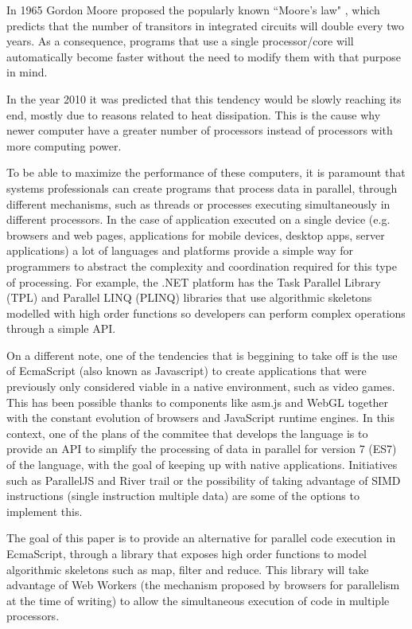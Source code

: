 \documentclass[runningheads,a4paper]{llncs}
\begin{document}
In 1965 Gordon Moore proposed the popularly known ``Moore's law" \cite{moore65}, which predicts that the number of transitors in integrated circuits will double every two years.
As a consequence, programs that use a single processor/core will automatically become faster without the need to modify them with that purpose in mind.

In the year 2010 it was predicted that this tendency would be slowly reaching its end, mostly due to reasons related to heat dissipation. This is the cause why newer computer have a greater number of processors instead of processors with more computing power.

To be able to maximize the performance of these computers, it is paramount that systems professionals can create programs that process data in parallel, through different mechanisms, such as threads or processes executing simultaneously in different processors. In the case of application executed on a single device (e.g. browsers and web pages, applications for mobile devices, desktop apps, server applications) a lot of languages and platforms provide a simple way for programmers to abstract the complexity and coordination required for this type of processing. For example, the .NET platform has the Task Parallel Library (TPL) and Parallel LINQ (PLINQ) \cite{ms-par} libraries that use algorithmic skeletons modelled with high order functions so developers can perform complex operations through a simple API.

On a different note, one of the tendencies that is beggining to take off is the use of EcmaScript \cite{es-web} (also known as Javascript) to create applications that were previously only considered viable in a native environment, such as video games. This has been possible thanks to components like asm.js \cite{asm-web} and WebGL \cite{webgl-web} together with the constant evolution of browsers and JavaScript runtime engines.
In this context, one of the plans of the commitee that develops the language is to provide an API to simplify the processing of data in parallel for version 7 (ES7) of the language, with the goal of keeping up with native applications. Initiatives such as ParallelJS \cite{par-js} and River trail \cite{rivertrail} or the possibility of taking advantage of SIMD instructions \cite{js-simd} (single instruction multiple data) are some of the options to implement this.

The goal of this paper is to provide an alternative for parallel code execution in EcmaScript, through a library that exposes high order functions to model algorithmic skeletons such as map, filter and reduce. This library will take advantage of Web Workers \cite{w3c-ww} (the mechanism proposed by browsers for parallelism at the time of writing) to allow the simultaneous execution of code in multiple processors.
\end{document}
